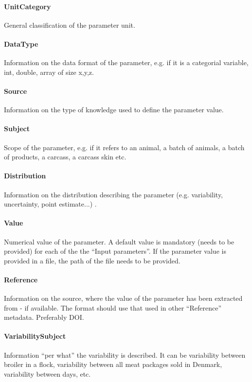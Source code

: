 \documentclass[a4paper]{report}
\begin{document}
\paragraph{UnitCategory}
General classification of the parameter unit.

\paragraph{DataType}
Information on the data format of the parameter, e.g. if it is a categorial variable, int, double, array of size x,y,z.

\paragraph{Source}
Information on the type of knowledge used to define the parameter value.

\paragraph{Subject}
Scope of the parameter, e.g. if it refers to an animal, a batch of animals, a batch of products, a carcass, a carcass skin etc.

\paragraph{Distribution}
Information on the distribution describing the parameter (e.g. variability, uncertainty, point estimate...) .

\paragraph{Value}
Numerical value of the parameter. A default value is mandatory (needs to be provided) for each of the the ``Input parameters''. If the parameter value is provided in a file, the path of the file needs to be provided.

\paragraph{Reference}
Information on the source, where the value of the parameter has been extracted from - if available. The format should use that used in other ``Reference'' metadata. Preferably DOI.

\paragraph{VariabilitySubject}
Information ``per what'' the variability is described. It can be variability between broiler in a flock,  variability between all meat packages sold in Denmark, variability between days, etc.
\end{document}
